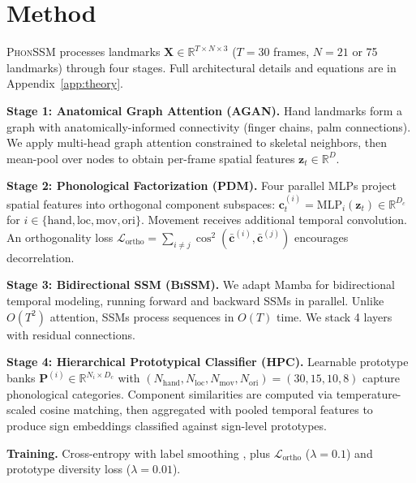 \documentclass{article}
\theoremstyle{definition}
\theoremstyle{remark}
\newcommand{\phonssm}{\textsc{PhonSSM}}
\newcommand{\agan}{\textsc{AGAN}}
\newcommand{\pdm}{\textsc{PDM}}
\newcommand{\bissm}{\textsc{BiSSM}}
\newcommand{\hpc}{\textsc{HPC}}
\begin{document}
\section{Method}
\label{sec:method}

\phonssm{} processes landmarks $\mathbf{X} \in \mathbb{R}^{T \times N \times 3}$ ($T{=}30$ frames, $N{=}21$ or 75 landmarks) through four stages. Full architectural details and equations are in Appendix~\ref{app:theory}.

\textbf{Stage 1: Anatomical Graph Attention (\agan{}).} Hand landmarks form a graph with anatomically-informed connectivity (finger chains, palm connections). We apply multi-head graph attention \citep{velivckovic2018graph} constrained to skeletal neighbors, then mean-pool over nodes to obtain per-frame spatial features $\mathbf{z}_t \in \mathbb{R}^{D}$.

\textbf{Stage 2: Phonological Factorization (\pdm{}).} Four parallel MLPs project spatial features into orthogonal component subspaces: $\mathbf{c}_t^{(i)} = \text{MLP}_i(\mathbf{z}_t) \in \mathbb{R}^{D_c}$ for $i \in \{\text{hand}, \text{loc}, \text{mov}, \text{ori}\}$. Movement receives additional temporal convolution. An orthogonality loss $\mathcal{L}_{\text{ortho}} = \sum_{i \neq j} \cos^2(\bar{\mathbf{c}}^{(i)}, \bar{\mathbf{c}}^{(j)})$ encourages decorrelation.

\textbf{Stage 3: Bidirectional SSM (\bissm{}).} We adapt Mamba \citep{gu2023mamba} for bidirectional temporal modeling, running forward and backward SSMs in parallel. Unlike $O(T^2)$ attention, SSMs process sequences in $O(T)$ time. We stack 4 layers with residual connections.

\textbf{Stage 4: Hierarchical Prototypical Classifier (\hpc{}).} Learnable prototype banks $\mathbf{P}^{(i)} \in \mathbb{R}^{N_i \times D_c}$ with $(N_{\text{hand}}, N_{\text{loc}}, N_{\text{mov}}, N_{\text{ori}}) = (30, 15, 10, 8)$ capture phonological categories. Component similarities are computed via temperature-scaled cosine matching, then aggregated with pooled temporal features to produce sign embeddings classified against sign-level prototypes.

\textbf{Training.} Cross-entropy with label smoothing \citep{szegedy2016rethinking}, plus $\mathcal{L}_{\text{ortho}}$ ($\lambda{=}0.1$) and prototype diversity loss ($\lambda{=}0.01$).


\end{document}
